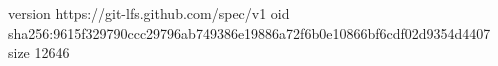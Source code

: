 version https://git-lfs.github.com/spec/v1
oid sha256:9615f329790ccc29796ab749386e19886a72f6b0e10866bf6cdf02d9354d4407
size 12646
